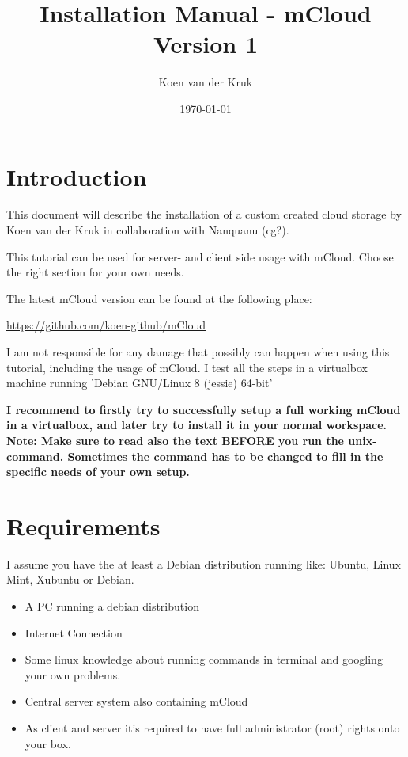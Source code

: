 \documentclass{article}
\title{Installation Manual - mCloud\\Version 1}
\author{Koen van der Kruk}
\date{\today}
\begin{document}
\maketitle

\tableofcontents

\newpage
\section{Introduction}
This document will describe the installation of a custom created cloud storage by Koen van der Kruk in collaboration with Nanquanu (cg?). 

This tutorial can be used for server- and client side usage with mCloud. Choose the right section for your own needs. 

The latest mCloud version can be found at the following place:

\url{https://github.com/koen-github/mCloud}

I am not responsible for any damage that possibly can happen when using this tutorial, including the usage of mCloud. 
I test all the steps in a virtualbox machine running 'Debian GNU/Linux 8 (jessie) 64-bit'



\textbf{I recommend to firstly try to successfully setup a full working mCloud in a virtualbox, and later try to install it in your normal workspace.
Note: Make sure to read also the text BEFORE you run the unix-command. Sometimes the command has to be changed to fill in the specific needs of your own setup.}



\section{Requirements}
I assume you have the at least a Debian distribution running like: Ubuntu, Linux Mint, Xubuntu or Debian. 

\begin{itemize}
    \item A PC running a debian distribution
    \item Internet Connection
    \item Some linux knowledge about running commands in terminal and googling your own problems.
    \item Central server system also containing mCloud
    \item As client and server it's required to have full administrator (root) rights onto your box.
\end{itemize}
\end{document}
